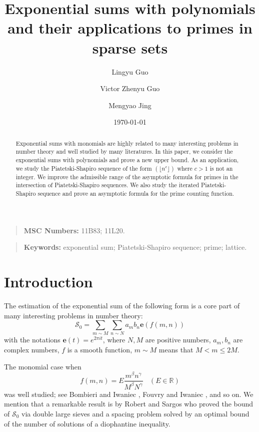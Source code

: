 \documentclass[12pt, reqno, twoside, letterpaper]{amsart}
\title[Exponential sums with polynomials]{Exponential sums with polynomials and their applications to primes in sparse sets}
\author[Lingyu Guo]{Lingyu Guo}
\author[Victor Z. Guo]{Victor Zhenyu Guo}
\author[Mengyao Jing]{Mengyao Jing}
\date{\today}
\numberwithin{equation}{section}
\newcommand{\e}{\ensuremath{\mathbf{e}}}
\newcommand{\cS}{\ensuremath{\mathcal{S}}}
\theoremstyle{customthm}
\theoremstyle{customrem}
\renewcommand{\le}{\ensuremath{\leqslant}}
\begin{document}
\begin{abstract}
Exponential sums with monomials are highly related to many interesting problems in number theory and well studied by many literatures. In this paper, we consider the exponential sums with polynomials and prove a new upper bound. As an application, we study the Piatetski-Shapiro sequence of the form $(\lfloor n^c \rfloor)$ where $c > 1$ is not an integer. We improve the admissible range of the asymptotic formula for primes in the intersection of Piatetski-Shapiro sequences. We also study the iterated Piatetski-Shapiro sequence and prove an asymptotic formula for the prime counting function.
\end{abstract}

\maketitle

\begin{quote}
\textbf{MSC Numbers:} 11B83; 11L20.
\end{quote}


\begin{quote}
\textbf{Keywords:} exponential sum; Piatetski-Shapiro sequence; prime; lattice.
\end{quote}



\tableofcontents


\section{Introduction}
\label{sec:introduction}

The estimation of the exponential sum of the following form is a core part of many interesting problems in number theory:
$$
\cS_0 = \sum_{m \sim M}  \sum_{n \sim N} a_{m} b_n \e(f(m,n))
$$
with the notations $\e(t) = e^{2\pi it}$, where $N, M$ are positive numbers, $a_{m}, b_n$ are complex numbers, $f$ is a smooth function, $m \sim M$ means that $M < m \le 2M$.

The monomial case when
$$
f(m,n) =    E\frac{m^\beta n^\gamma}{M^\beta N^\gamma}\ \ \ \ (E\in\mathbb{R})
$$
was well studied; see Bombieri and Iwaniec \cite{BI1986}, Fouvry and Iwaniec \cite{FI1989},  and so on. We mention that a remarkable result is by Robert and Sargos \cite{RS2006} who proved the bound of $\cS_0$ via double large sieves and a spacing problem solved by an optimal bound of the number of solutions of a diophantine inequality.
\end{document}
